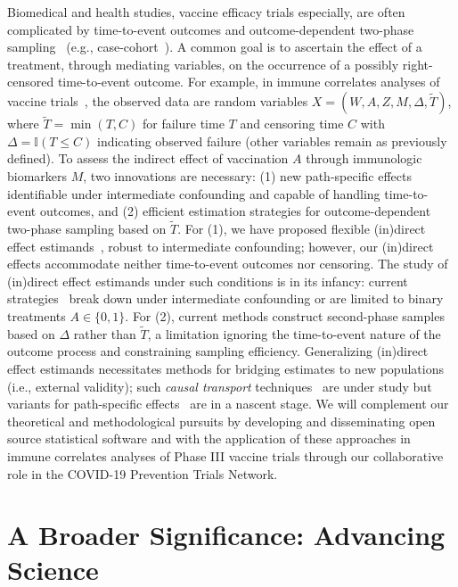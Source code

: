 Biomedical and health studies, vaccine efficacy trials especially, are often
complicated by time-to-event outcomes and outcome-dependent two-phase
sampling~\citep{follmann2006augmented} (e.g.,
case-cohort~\citep{prentice1986case, barlow1999analysis, mcelrath2008hiv}).
A common goal is to ascertain the effect of a treatment, through mediating
variables, on the occurrence of a possibly right-censored time-to-event outcome.
For example, in immune correlates analyses of vaccine
trials~\citep{haynes2012immune}, the observed data are random variables $X =
(W, A, Z, M, \Delta, \widetilde{T})$, where $\widetilde{T} = \min(T, C)$ for
failure time $T$ and censoring time $C$ with $\Delta = \mathbb{I}(T \leq C)$
indicating observed failure (other variables remain as previously defined). To
assess the indirect effect of vaccination $A$ through immunologic biomarkers
$M$, two innovations are necessary: (1) new path-specific effects identifiable
under intermediate confounding and capable of handling time-to-event outcomes,
and (2) efficient estimation strategies for outcome-dependent two-phase sampling
based on $\widetilde{T}$. For (1), we have proposed flexible (in)direct effect
estimands~\citep{diaz2020causal, hejazi2020nonparametric}, robust to
intermediate confounding; however, our (in)direct effects accommodate neither
time-to-event outcomes nor censoring. The study of (in)direct effect estimands
under such conditions is in its infancy: current
strategies~\citep[e.g.,][]{tchetgen2011causal, zheng2017longitudinal} break down
under intermediate confounding or are limited to binary treatments $A \in \{0,
1\}$. For (2), current methods construct second-phase samples based on $\Delta$
rather than $\widetilde{T}$, a limitation ignoring the time-to-event nature of
the outcome process and constraining sampling efficiency. Generalizing
(in)direct effect estimands necessitates methods for bridging estimates to new
populations (i.e., external validity); such \textit{causal transport}
techniques~\citep{pearl2011transportability, pearl2014external,
bareinboim2016causal} are under study but variants for
path-specific effects~\citep[e.g.,][]{rudolph2020efficiently}
are in a nascent stage. We will complement our theoretical and methodological
pursuits by developing and disseminating open source statistical software and
with the application of these approaches in immune correlates analyses of Phase
III vaccine trials through our collaborative role in the COVID-19 Prevention
Trials Network.

\section{A Broader Significance: Advancing Science}

